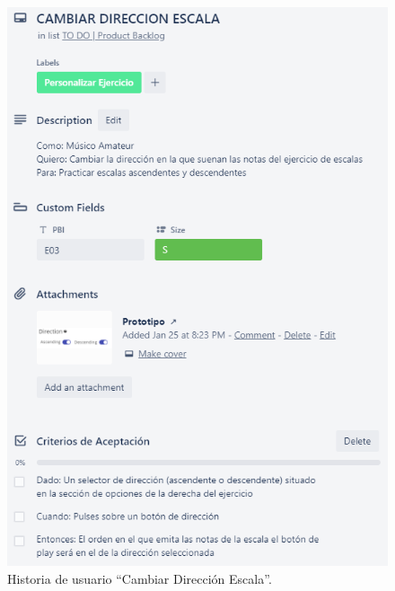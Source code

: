 \documentclass[12pt,twoside,titlepage]{report}
\begin{document}
\begin{figure}[H]
    \centering
    \includegraphics[scale=1.3]{Scrum/User Stories/EscalasDireccion}
    \caption{Historia de usuario ``Cambiar Dirección Escala''.}
    \label{fig:EscalasDireccion}
\end{figure}
\end{document}
